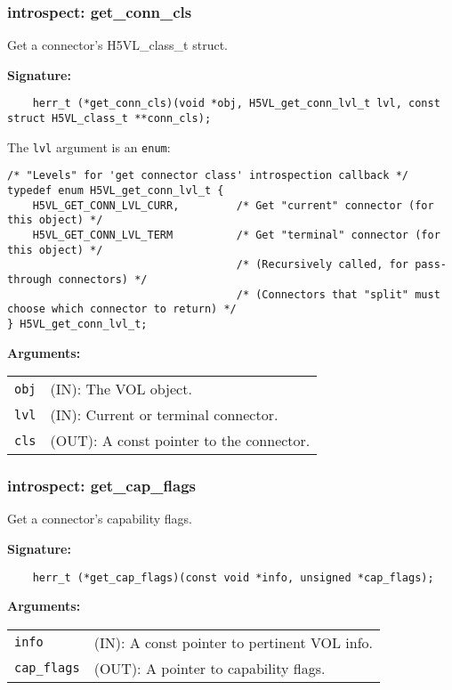 \subsubsection{introspect: get\_conn\_cls}
Get a connector's H5VL\_class\_t struct.

\begin{mdframed}[style=bgbox]
\textbf{Signature:}
\begin{lstlisting}
    herr_t (*get_conn_cls)(void *obj, H5VL_get_conn_lvl_t lvl, const struct H5VL_class_t **conn_cls);
\end{lstlisting}

The \texttt{lvl} argument is an \texttt{enum}:
\begin{lstlisting}
/* "Levels" for 'get connector class' introspection callback */                  
typedef enum H5VL_get_conn_lvl_t {
    H5VL_GET_CONN_LVL_CURR,         /* Get "current" connector (for this object) */
    H5VL_GET_CONN_LVL_TERM          /* Get "terminal" connector (for this object) */
                                    /* (Recursively called, for pass-through connectors) */
                                    /* (Connectors that "split" must choose which connector to return) */
} H5VL_get_conn_lvl_t;
\end{lstlisting}

\textbf{Arguments:}\\
\begin{tabular}{l p{13.5cm}}
  \texttt{obj} & (IN): The VOL object.\\
  \texttt{lvl} & (IN): Current or terminal connector.\\
  \texttt{cls} & (OUT): A const pointer to the connector.\\
\end{tabular}
\end{mdframed}

\subsubsection{introspect: get\_cap\_flags}
Get a connector's capability flags.

\begin{mdframed}[style=bgbox]
\textbf{Signature:}
\begin{lstlisting}
    herr_t (*get_cap_flags)(const void *info, unsigned *cap_flags);
\end{lstlisting}

\textbf{Arguments:}\\
\begin{tabular}{l p{13.5cm}}
  \texttt{info} & (IN): A const pointer to pertinent VOL info.\\
  \texttt{cap\_flags} & (OUT): A pointer to capability flags.\\
\end{tabular}
\end{mdframed}


